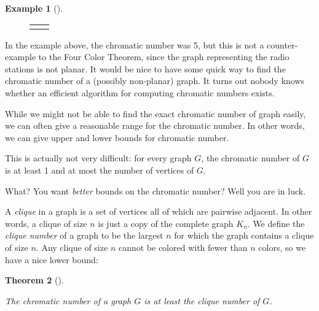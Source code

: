 \documentclass[10pt,]{book}
\theoremstyle{plain}
\newtheorem{theorem}{Theorem}[section]
\theoremstyle{definition}
\newtheorem{example}[theorem]{Example}
\theoremstyle{definition}
\theoremstyle{definition}
\numberwithin{equation}{chapter}
\newlength{\panelmax}
\newcommand{\vtx}[2]{node[fill,circle,inner sep=0pt, minimum size=4pt,label=#1:#2]{}}
\newcommand{\va}[1]{\vtx{above}{#1}}
\newcommand{\vb}[1]{\vtx{below}{#1}}
\newcommand{\vr}[1]{\vtx{right}{#1}}
\newcommand{\vl}[1]{\vtx{left}{#1}}
\begin{document}
\begin{example}[]
{{{{
}
}}
\newlength{\phCWimage}\setlength{\phCWimage}{\ht\panelboxCWimage+\dp\panelboxCWimage}
\settototalheight{\phCWimage}{\usebox{\panelboxCWimage}}
\setlength{\panelmax}{\maxof{\panelmax}{\phCWimage}}
\leavevmode%
\setlength{\tabcolsep}{0\textwidth}
\begin{figure}
\begin{tabular}{@{}*{2}{c}@{}}
\begin{minipage}[c][\panelmax][t]{0.5\textwidth}\usebox{\panelboxCVimage}\end{minipage}&
\begin{minipage}[c][\panelmax][t]{0.5\textwidth}\usebox{\panelboxCWimage}\end{minipage}\end{tabular}
\end{figure}
}%
\end{example}
\par

In the example above, the chromatic number was 5, but this is not a counter-example to the Four Color Theorem, since the graph representing the radio stations is not planar. It would be nice to have some quick way to find the chromatic number of a (possibly non-planar) graph. It turns out nobody knows whether an efficient algorithm for computing chromatic numbers exists.
%
\par

While we might not be able to find the exact chromatic number of graph easily, we can often give a reasonable range for the chromatic number. In other words, we can give upper and lower bounds for chromatic number.
%
\par

This is actually not very difficult: for every graph \(G\), the chromatic number of \(G\) is at least 1 and at most the number of vertices of \(G\).
%
\par

What? You want \emph{better} bounds on the chromatic number? Well you are in luck.
%
\par

A \emph{clique} in a graph is a set of vertices all of which are pairwise adjacent. In other words, a clique of size \(n\) is just a copy of the complete graph \(K_n\). We define the \emph{clique number} of a graph to be the largest \(n\) for which the graph contains a clique of size \(n\). Any clique of size \(n\) cannot be colored with fewer than \(n\) colors, so we have a nice lower bound:
%
\begin{theorem}[]\label{theorem-6}

The chromatic number of a graph \(G\) is at least the clique number of \(G\).
%
\end{theorem}
\par
\end{document}
